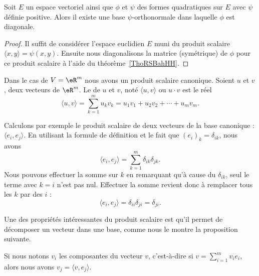 \begin{corollary}   \label{CorSMHpoVK}
    Soit \( E\) un espace vectoriel ainsi que \( \phi\) et \( \psi\) des formes quadratiques sur \( E\) avec \( \psi\) définie positive. Alors il existe une base \( \psi\)-orthonormale dans laquelle \( \phi\) est diagonale.
\end{corollary}

\begin{proof}
    Il suffit de considérer l'espace euclidien \( E\) muni du produit scalaire \( \langle x, y\rangle =\psi(x,y)\). Ensuite nous diagonalisons la matrice (symétrique) de \( \phi\) pour ce produit scalaire à l'aide du théorème~\ref{ThoRSBahHH}.
\end{proof}

\begin{definition}      \label{DefYNWUFc}
    Dans le cas de \( V=\eR^m\) nous avons un produit scalaire canonique. Soient \( u\) et \( v\), deux vecteurs de \( \eR^m\). Le  de \( u\) et \( v\), noté \( \langle u, v\rangle\) ou \( u\cdot v\) est le réel
    \begin{equation}      \label{EqDefProdScalsumii}
        \langle u, v\rangle =\sum_{k=1}^m u_kv_k=u_1v_1+u_2v_2+\cdots+u_mv_m.
    \end{equation}
\end{definition}

Calculons par exemple le produit scalaire de deux vecteurs de la base canonique : \( \langle e_i, e_j\rangle\). En utilisant la formule de définition et le fait que \( (e_i)_k=\delta_{ik}\), nous avons
\begin{equation}
    \langle e_i, e_j\rangle =\sum_{k=1}^m\delta_{ik}\delta_{jk}.
\end{equation}
Nous pouvons effectuer la somme sur $k$ en remarquant qu'à cause du \( \delta_{ik}\), seul le terme avec \( k=i\) n'est pas nul. Effectuer la somme revient donc à remplacer tous les \( k\) par des \( i\) :
\begin{equation}
    \langle e_i, e_j\rangle =\delta_{ii}\delta_{ji}=\delta_{ji}.
\end{equation}

Une des propriétés intéressantes du produit scalaire est qu'il permet de décomposer un vecteur dans une base, comme nous le montre la proposition suivante.

\begin{proposition}     \label{PropScalCompDec}
    Si nous notons \( v_i\) les composantes du vecteur \( v\), c'est-à-dire si \( v=\sum_{i=1}^m v_ie_i\), alors nous avons \( v_j=\langle v, e_j\rangle\).
\end{proposition}

